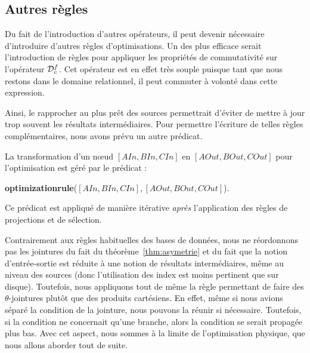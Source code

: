 \subsection{Autres règles}
Du fait de l'introduction d'autres opérateurs, il peut devenir nécessaire d'introduire d'autres règles d'optimisations. Un des plus efficace serait l'introduction de règles pour appliquer les propriétés de commutativité sur l'opérateur $\mathcal{D}_c^f$. Cet opérateur est en effet très souple puisque tant que nous restons dans le domaine relationnel, il peut commuter à volonté dans cette expression.

Ainsi, le rapprocher au plus prêt des sources permettrait d'éviter de mettre à jour trop souvent les résultats intermédiaires. Pour permettre l'écriture de telles règles complémentaires, nous avons prévu un autre prédicat.
\begin{regle}
La transformation d'un nœud $[AIn,BIn,CIn]$ en $[AOut,BOut,COut]$ pour l'optimisation est géré par le prédicat :
\begin{center} \textbf{optimizationrule}($[AIn,BIn,CIn],[AOut,BOut,COut]$).\end{center}
Ce prédicat est appliqué de manière itérative \textit{après} l'application des règles de projections et de sélection.
\end{regle}

Contrairement aux règles habituelles des bases de données, nous ne réordonnons pas les jointures du fait du théorème~\ref{thm:asymetrie} et du fait que la notion d'entrée-sortie est réduite à une notion de résultats intermédiaires, même au niveau des sources (donc l'utilisation des index est moins pertinent que sur disque). Toutefois, nous appliquons tout de même la règle permettant de faire des $\theta$-jointures plutôt que des produits cartésiens. En effet, même si nous avions séparé la condition de la jointure, nous pouvons la réunir si nécessaire. Toutefois, si la condition ne concernait qu'une branche, alors la condition se serait propagée plus bas. Avec cet aspect, nous sommes à la limite de l'optimisation physique, que nous allons aborder tout de suite.